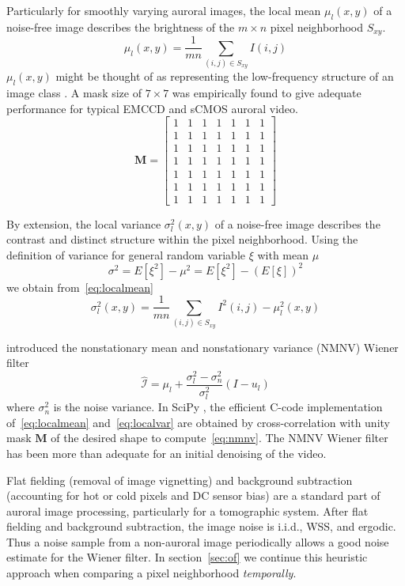 Particularly for smoothly varying auroral images, the local mean $\mu_l(x,y)$ of a noise-free image describes the brightness of the $m \times n$ pixel neighborhood $S_{xy}$.
\begin{equation}\label{eq:localmean}
\mu_l(x,y) = \frac{1}{mn} \sum_{(i,j)\in S_{xy}} I(i,j)
\end{equation}
$\mu_l(x,y)$ might be thought of as representing the low-frequency structure of an image class \citep{hunt1980}.
A mask size of $7\times7$ was empirically found to give adequate performance for typical EMCCD and sCMOS auroral video.
\begin{equation}
\textbf{M}=
\begin{bmatrix} 
1 & 1 & 1 & 1 & 1 & 1 & 1 \\ 
1 & 1 & 1 & 1 & 1 & 1 & 1 \\ 
1 & 1 & 1 & 1 & 1 & 1 & 1 \\ 
1 & 1 & 1 & 1 & 1 & 1 & 1 \\ 
1 & 1 & 1 & 1 & 1 & 1 & 1 \\ 
1 & 1 & 1 & 1 & 1 & 1 & 1 \\ 
1 & 1 & 1 & 1 & 1 & 1 & 1  
\end{bmatrix}
\end{equation}

By extension, the local variance $\sigma_l^2(x,y)$ of a noise-free image describes the contrast and distinct structure within the pixel neighborhood.
Using the definition of variance for general random variable $\xi$ with mean $\mu$
\begin{equation}
\sigma^2 = E[\xi^2] - \mu^2 = E[\xi^2] - (E[\xi])^2
\end{equation}
we obtain from~\eqref{eq:localmean}
\begin{equation}\label{eq:localvar}
\sigma_l^2(x,y) = \frac{1}{mn} \sum_{(i,j)\in S_{xy}} I^2(i,j) - \mu_l^2(x,y)
\end{equation}

\citet{kuan1985} introduced the nonstationary mean and nonstationary variance (NMNV) Wiener filter
\begin{equation}\label{eq:nmnv}
\widehat{\mathscr{I}} = \mu_l + \frac{\sigma_l^2 - \sigma_n^2}{\sigma_l^2}(I-u_l)
\end{equation}
where $\sigma_n^2$ is the noise variance.
In SciPy \citep{scipy}, the efficient C-code implementation of~\eqref{eq:localmean} and~\eqref{eq:localvar} are obtained by cross-correlation with unity mask $\textbf{M}$ of the desired shape to compute~\eqref{eq:nmnv}.
The NMNV Wiener filter has been more than adequate for an initial denoising of the video.

Flat fielding (removal of image vignetting) and background subtraction (accounting for hot or cold pixels and DC sensor bias) are a standard part of auroral image processing, particularly for a tomographic system.
After flat fielding and background subtraction, the image noise is i.i.d., WSS, and ergodic. 
Thus a noise sample from a non-auroral image periodically allows a good noise estimate for the Wiener filter.
In section~\ref{sec:of} we continue this heuristic approach when comparing a pixel neighborhood \textit{temporally}.
